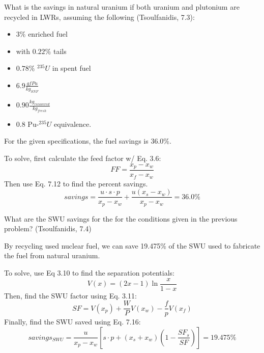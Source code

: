 \documentclass[11pt,answers,addpoints]{exam}
\begin{document}
\begin{questions}
        \question[50] What is the savings in natural uranium if both uranium 
        and plutonium are recycled in LWRs, assuming the following 
        (Tsoulfanidis, 7.3): 
        \begin{itemize}
                \item $3\%$ enriched fuel 
                \item with $0.22\%$ tails
                \item $0.78\%$ $^{235}U$ in spent fuel
                \item $6.9\frac{gfPu}{kg_{SNF}}$
                \item $0.90\frac{kg_{recovered}}{kg_{fresh}}$
                \item 0.8 Pu-$^{235}U$ equivalence.
        \end{itemize}
        \begin{solution}
        For the given specifications, the fuel savings is 36.0\%.

        
        To solve, first calculate the feed factor w/ Eq. 3.6:
        \begin{equation}
            FF = \frac{x_p - x_w}{x_f - x_w}
        \end{equation}
        Then use Eq. 7.12 to find the percent savings.
        \begin{equation}
            savings = \frac{u \cdot s \cdot p}{x_p - x_w} + \frac{u \left(x_s - x_w \right)}{x_p - x_w} = 36.0\%
        \end{equation}
        \end{solution}
        \question[50] What are the SWU savings for the for the conditions given 
        in the previous problem? (Tsoulfanidis, 7.4) 
        \begin{solution}
        By recycling used nuclear fuel, we can save 19.475\% of the SWU used to fabricate the fuel from natural uranium.

        To solve, use Eq 3.10 to find the separation potentials:
        \begin{equation}
            V(x) = (2 x - 1) \ln{\frac{x}{1 - x}}
        \end{equation}
        Then, find the SWU factor using Eq. 3.11:
        \begin{equation}
            SF = V(x_p) + \frac{W}{P} V(x_w) - \frac{f}{p} V(x_f)
        \end{equation}
        Finally, find the SWU saved using Eq. 7.16:
        \begin{equation}
            savings_{SWU} = \frac{u}{x_p - x_w} \left[
            s \cdot p + (x_s + x_w) \left( 1 - \frac{SF_s}{SF} \right)
            \right] = 19.475\%
        \end{equation}
        \end{solution}

\end{questions}
\end{document}
